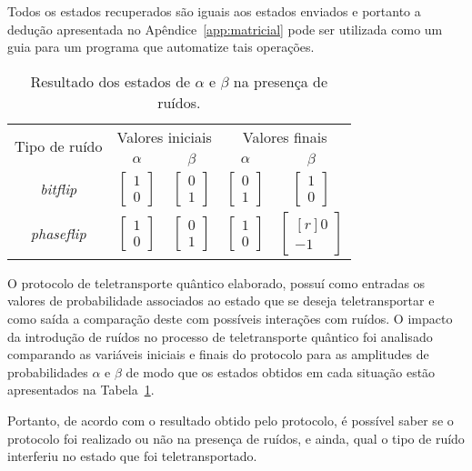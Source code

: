 Todos os estados recuperados são iguais aos estados enviados e portanto a dedução apresentada no Apêndice~\ref{app:matricial} pode ser utilizada como um guia para um programa que automatize tais operações.
\begin{table}[ht!]
  \centering
  \caption{Resultado dos estados de $\alpha$ e $\beta$ na presença de ruídos.}\label{tab:resultadoruidos}
  \begin{tabular}{ccccc}
    \toprule
    \multirow{2}{*}{Tipo de ruído} & \multicolumn{2}{c}{Valores iniciais} & \multicolumn{2}{c}{Valores finais}                                     \\
    \cmidrule{2-5}
                                   & $\alpha$ & $\beta$ & $\alpha$ & $\beta$ \\
    \midrule
    \textit{bitflip}   & $\begin{bmatrix} 1 \\ 0 \end{bmatrix}$ & $\begin{bmatrix} 0 \\ 1 \end{bmatrix}$ & $\begin{bmatrix} 0 \\ 1 \end{bmatrix}$ & $\begin{bmatrix} 1 \\ 0 \end{bmatrix}$ \\
    \textit{phaseflip} & $\begin{bmatrix} 1 \\ 0 \end{bmatrix}$ & $\begin{bmatrix} 0 \\ 1 \end{bmatrix}$ & $\begin{bmatrix} 1 \\ 0 \end{bmatrix}$ & $\begin{bmatrix*}[r] 0 \\ -1 \end{bmatrix*}$ \\
    \bottomrule
  \end{tabular}
\end{table}
O protocolo de teletransporte quântico elaborado, possuí como entradas os valores de probabilidade associados ao estado que se deseja teletransportar e como saída a comparação deste com possíveis interações com ruídos. O impacto da introdução de ruídos no processo de teletransporte quântico foi analisado comparando as variáveis iniciais e finais do protocolo para as amplitudes de probabilidades $\alpha$ e $\beta$ de modo que os estados obtidos em cada situação estão apresentados na Tabela~\ref{tab:resultadoruidos}.

Portanto, de acordo com o resultado obtido pelo protocolo, é possível saber se o protocolo foi realizado ou não na presença de ruídos, e ainda, qual o tipo de ruído interferiu no estado que foi teletransportado.
